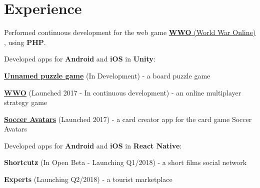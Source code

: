 \documentclass[a4paper]{deedy-resume} %
\begin{document}
\hfill
%
%
\begin{minipage}[t]{0.64\textwidth} %


\section{Experience}
\begin{tightitemize}
    \vspace{\topsep}
    \item Performed continuous development for the web game \href{https://www.worldwaronline.com/}{\textbf{WWO} (World War Online)} , using \textbf{PHP}.
    \item Developed apps for \textbf{Android} and \textbf{iOS} in \textbf{Unity}:
    \begin{innertightitemize}
        \item \href{https://www.chilltime.com/products/marble}{\textbf{Unnamed puzzle game}} (In Development) - a board puzzle game
        \item \href{https://www.worldwaronline.com/}{\textbf{WWO}} (Launched 2017 - In continuous development) - an online multiplayer strategy game
        \item \href{https://www.socceravatars.com/}{\textbf{Soccer Avatars}} (Launched 2017) - a card creator app for the card game Soccer Avatars
    \end{innertightitemize}
    \item Developed apps for \textbf{Android} and \textbf{iOS} in \textbf{React Native}:
    \begin{innertightitemize}
        \item \textbf{Shortcutz} (In Open Beta - Launching Q1/2018) - a short films social network
        \item \textbf{Experts} (Launching Q2/2018) - a tourist marketplace
    \end{innertightitemize}
\end{tightitemize}


\end{minipage}
\end{document}
